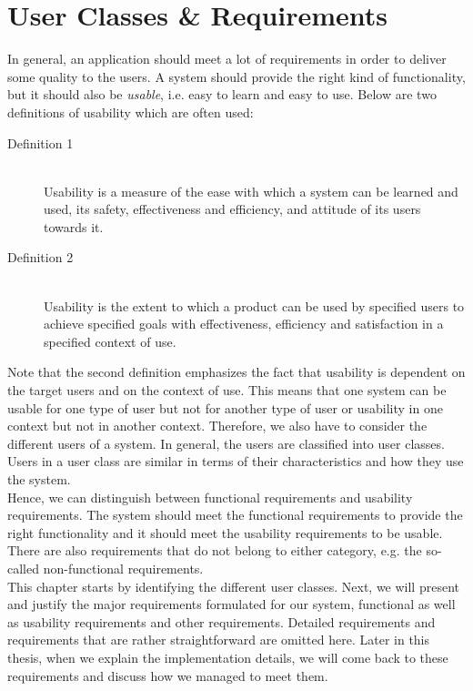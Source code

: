 \chapter{User Classes \& Requirements}\label{ch:requirements}

In general, an application should meet a lot of requirements in order to deliver some quality to the users. A system should provide the right kind of functionality, but it should also be \textit{usable}, i.e. easy to learn and easy to use. Below are two definitions of usability which are often used:
\begin{description}
	\item[Definition 1] \hfill \\
	Usability is a measure of the ease with which a system can be learned and used, its safety, effectiveness and efficiency, and attitude of its users towards it. \hfill \citep{usability-definition-preece}

	\item[Definition 2] \hfill \\
	Usability is the extent to which a product can be used by specified users to achieve specified goals with effectiveness, efficiency and satisfaction in a specified context of use. \hfill \citep{usability-definition-improved}
\end{description}

Note that the second definition emphasizes the fact that usability is dependent on the target users and on the context of use. This means that one system can be usable for one type of user but not for another type of user or usability in one context but not in another context. Therefore, we also have to consider the different users of a system. In general, the users are classified into user classes. Users in a user class are similar in terms of their characteristics and how they use the system.\\

Hence, we can distinguish between functional requirements and usability requirements. The system should meet the functional requirements to provide the right functionality and it should meet the usability requirements to be usable. There are also requirements that do not belong to either category, e.g. the so-called non-functional requirements.\\

This chapter starts by identifying the different user classes. Next, we will present and justify the major requirements formulated for our system, functional as well as usability requirements and other requirements. Detailed requirements and requirements that are rather straightforward are omitted here. Later in this thesis, when we explain the implementation details, we will come back to these requirements and discuss how we managed to meet them.



